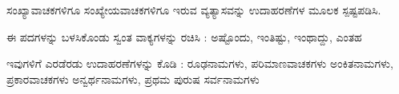 \vspace{2.5pt plus 3pt minus 0.5pt}\noindent\hspace*{1.2em}\hspace{0.55em}ಸಂಖ್ಯಾವಾಚಕಗಳಿಗೂ ಸಂಖ್ಯೇಯವಾಚಕಗಳಿಗೂ ಇರುವ ವ್ಯತ್ಯಾಸವನ್ನು ಉದಾಹರಣೆಗಳ ಮೂಲಕ ಸ್ಪಷ್ಟಪಡಿಸಿ.\par

\vspace{2.5pt plus 3pt minus 0.5pt}\noindent\hspace*{1.2em}\hspace{0.55em}ಈ ಪದಗಳನ್ನು ಬಳಸಿಕೊಂಡು ಸ್ವಂತ ವಾಕ್ಯಗಳನ್ನು ರಚಿಸಿ : ಅಷ್ಟೊಂದು, ಇಂತಿಷ್ಟು, ಇಂಥಾದ್ದು, ಎಂತಹ\par

\vspace{2.5pt plus 3pt minus 0.5pt}\noindent\hspace*{1.2em}\hspace{0.55em}ಇವುಗಳಿಗೆ ಎರಡೆರಡು ಉದಾಹರಣೆಗಳನ್ನು ಕೊಡಿ : ರೂಢನಾಮಗಳು, ಪರಿಮಾಣವಾಚಕಗಳು ಅಂಕಿತನಾಮಗಳು, ಪ್ರಕಾರವಾಚಕಗಳು ಅನ್ವರ್ಥನಾಮಗಳು, ಪ್ರಥಮ ಪುರುಷ ಸರ್ವನಾಮಗಳು\par
